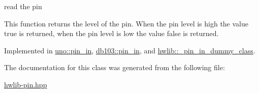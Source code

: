 read the pin 

This function returns the level of the pin. When the pin level is high the value true is returned, when the pin level is low the value false is returned. 

Implemented in \hyperlink{classuno_1_1pin__in_ae5e5e3db2a5616ea3ba147739ac747ef}{uno\+::pin\+\_\+in}, \hyperlink{classdb103_1_1pin__in_a553663fb9fbb81aad104c0d52cff4839}{db103\+::pin\+\_\+in}, and \hyperlink{classhwlib_1_1__pin__in__dummy__class_a2b51c1a0d291cd4414e70504d388c9cb}{hwlib\+::\+\_\+pin\+\_\+in\+\_\+dummy\+\_\+class}.



The documentation for this class was generated from the following file\+:\begin{DoxyCompactItemize}
\item 
\hyperlink{hwlib-pin_8hpp}{hwlib-\/pin.\+hpp}\end{DoxyCompactItemize}

